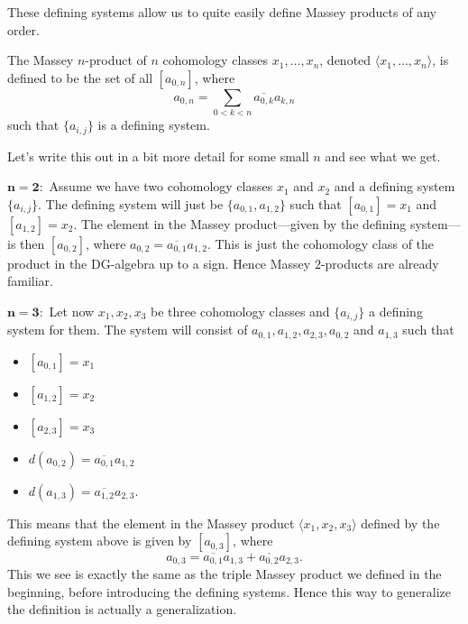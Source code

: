 These defining systems allow us to quite easily define Massey products of any order. 

\begin{definition}
The Massey $n$-product of $n$ cohomology classes $x_1, \ldots, x_n$, denoted $\langle x_1, \ldots, x_n\rangle$, is defined to be the set of all $[a_{0,n}]$, where
\begin{equation*}
    a_{0,n} = \sum_{0<k<n}\overline{a_{0, k}}a_{k, n}
\end{equation*}
such that $\{ a_{i,j} \}$ is a defining system.
\end{definition}

Let's write this out in a bit more detail for some small $n$ and see what we get. 

$\mathbf{n=2}:$ Assume we have two cohomology classes $x_1$ and $x_2$ and a defining system $\{a_{i,j} \}$. The defining system will just be $\{ a_{0,1}, a_{1,2}\}$ such that $[a_{0,1}]=x_1$ and  $[a_{1,2}] = x_2$. The element in the Massey product---given by the defining system---is then $[a_{0,2}]$, where $a_{0, 2} = \overline{a_{0, 1}}a_{1, 2}$. This is just the cohomology class of the product in the DG-algebra up to a sign. Hence Massey $2$-products are already familiar. 


$\mathbf{n=3}:$ Let now $x_1, x_2, x_3$ be three cohomology classes and $\{a_{i,j}\}$ a defining system for them. The system will consist of $a_{0,1}, a_{1,2}, a_{2,3}, a_{0,2}$ and $a_{1,3}$ such that 
\begin{itemize}
    \item $[a_{0,1}] = x_1$
    \item $[a_{1,2}] = x_2$
    \item $[a_{2,3}] = x_3$
    \item $d(a_{0,2}) = \overline{a_{0,1}} a_{1,2}$
    \item $d(a_{1,3}) = \overline{a_{1,2}} a_{2,3}$.
\end{itemize}
This means that the element in the Massey product $\langle x_1, x_2, x_3 \rangle$ defined by the defining system above is given by $[a_{0,3}]$, where
\begin{equation*}
    a_{0,3} = \overline{a_{0, 1}}a_{1, 3} + \overline{a_{0, 2}}a_{2, 3}.
\end{equation*}
This we see is exactly the same as the triple Massey product we defined in the beginning, before introducing the defining systems. Hence this way to generalize the definition is actually a generalization. 

